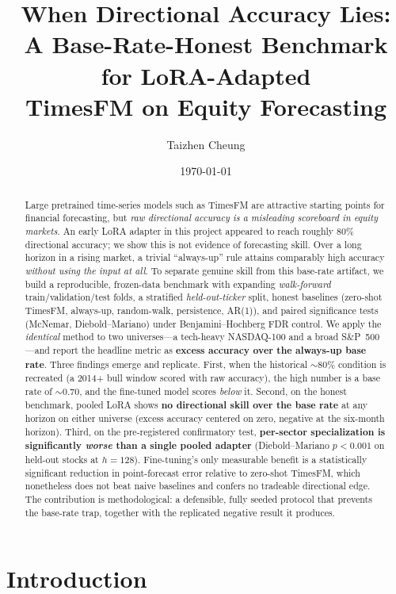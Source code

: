 \documentclass[11pt]{article}
\title{\textbf{When Directional Accuracy Lies:\\ A Base-Rate-Honest Benchmark for LoRA-Adapted\\ TimesFM on Equity Forecasting}}
\author{Taizhen Cheung}
\date{\today}
\begin{document}
\maketitle

\begin{abstract}
Large pretrained time-series models such as TimesFM are attractive starting points
for financial forecasting, but \emph{raw directional accuracy is a misleading
scoreboard in equity markets}. An early LoRA adapter in this project appeared to
reach roughly $80\%$ directional accuracy; we show this is not evidence of
forecasting skill. Over a long horizon in a rising market, a trivial ``always-up''
rule attains comparably high accuracy \emph{without using the input at all}. To
separate genuine skill from this base-rate artifact, we build a reproducible,
frozen-data benchmark with expanding \emph{walk-forward} train/validation/test
folds, a stratified \emph{held-out-ticker} split, honest baselines (zero-shot
TimesFM, always-up, random-walk, persistence, AR(1)), and paired significance tests
(McNemar, Diebold--Mariano) under Benjamini--Hochberg FDR control. We apply the
\emph{identical} method to two universes---a tech-heavy NASDAQ-100 and a broad
S\&P~500---and report the headline metric as \textbf{excess accuracy over the
always-up base rate}. Three findings emerge and replicate. First, when the
historical $\sim$80\% condition is recreated (a 2014+ bull window scored with raw
accuracy), the high number is a base rate of $\sim$0.70, and the fine-tuned model
scores \emph{below} it. Second, on the honest benchmark, pooled LoRA shows
\textbf{no directional skill over the base rate} at any horizon on either universe
(excess accuracy centered on zero, negative at the six-month horizon). Third, on the
pre-registered confirmatory test, \textbf{per-sector specialization is significantly
\emph{worse} than a single pooled adapter} (Diebold--Mariano $p<0.001$ on held-out
stocks at $h=128$). Fine-tuning's only measurable benefit is a statistically
significant reduction in point-forecast error relative to zero-shot TimesFM, which
nonetheless does not beat naive baselines and confers no tradeable directional edge.
The contribution is methodological: a defensible, fully seeded protocol that prevents
the base-rate trap, together with the replicated negative result it produces.
\end{abstract}

\section{Introduction}
\end{document}
